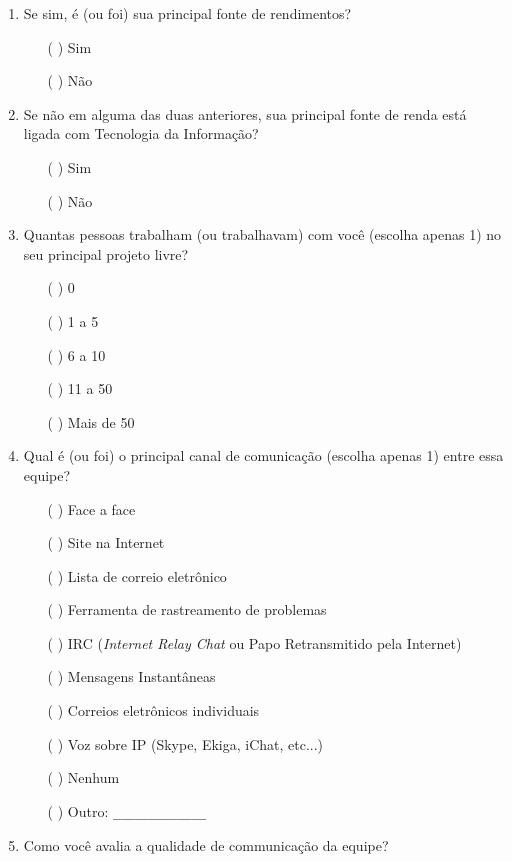 \begin{enumerate}
\item Se sim, é (ou foi) sua principal fonte de rendimentos?
  \begin{itemize}
  \item[( )] Sim
  \item[( )] Não
  \end{itemize}

\item Se não em alguma das duas anteriores, sua principal fonte de
  renda está ligada com Tecnologia da Informação?
  \begin{itemize}
  \item[( )] Sim
  \item[( )] Não
  \end{itemize}

\item Quantas pessoas trabalham (ou trabalhavam) com você (escolha
  apenas 1) no seu principal projeto livre?
  \begin{itemize}
  \item[( )] 0
  \item[( )] 1 a 5
  \item[( )] 6 a 10
  \item[( )] 11 a 50
  \item[( )] Mais de 50
  \end{itemize}

\item Qual é (ou foi) o principal canal de comunicação (escolha apenas
  1) entre essa equipe?
  \begin{itemize}
  \item[( )] Face a face
  \item[( )] Site na Internet
  \item[( )] Lista de correio eletrônico
  \item[( )] Ferramenta de rastreamento de problemas
  \item[( )] IRC (\textit{Internet Relay Chat} ou Papo Retransmitido
    pela Internet)
  \item[( )] Mensagens Instantâneas
  \item[( )] Correios eletrônicos individuais
  \item[( )] Voz sobre IP (Skype, Ekiga, iChat, etc...)
  \item[( )] Nenhum
  \item[( )] Outro: \verb=_____________=
  \end{itemize}

\item Como você avalia a qualidade de communicação da equipe?


\end{enumerate}
